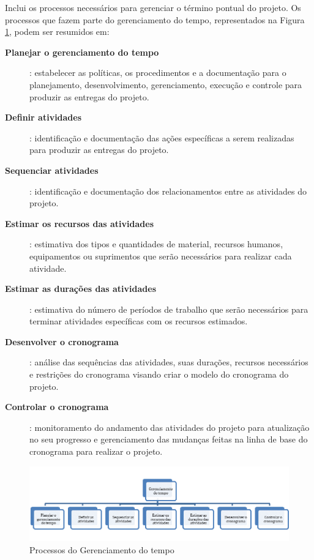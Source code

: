 

Inclui os processos necessários para gerenciar o término pontual do projeto. Os processos que fazem parte do gerenciamento do tempo, representados na Figura \ref{fig:proc:ger:tempo}, podem ser resumidos em:

\begin{description}
	
	\item[\textbf{Planejar o gerenciamento do tempo}]: estabelecer as políticas, os procedimentos e a documentação para o planejamento, desenvolvimento, gerenciamento, execução e controle para produzir as entregas do projeto.
	
	\item[\textbf{Definir atividades}]: identificação e documentação das ações específicas a serem realizadas para produzir as entregas do projeto.
	
	\item[\textbf{Sequenciar atividades}]: identificação e documentação dos relacionamentos entre as atividades do projeto.
	
	\item[\textbf{Estimar os recursos das atividades}]: estimativa dos tipos e quantidades de material, recursos humanos, equipamentos ou suprimentos que serão necessários para realizar cada atividade.
	
	\item[\textbf{Estimar as durações das atividades}]: estimativa do número de períodos de trabalho que serão necessários para terminar atividades específicas com os recursos estimados.
	
	\item[\textbf{Desenvolver o cronograma}]: análise das sequências das atividades, suas durações, recursos necessários e restrições do cronograma visando criar o modelo do cronograma do projeto.	
	
	\item[\textbf{Controlar o cronograma}]: monitoramento do andamento das atividades do projeto para atualização no seu progresso e gerenciamento das mudanças feitas na linha de base do cronograma para realizar o projeto.	
	
\end{description}

\begin{figure}[!h]
	\centering
	\includegraphics[scale=0.75]{Figuras/gerenciamento_tempo.png}
	\caption{Processos do Gerenciamento do tempo}
	\label{fig:proc:ger:tempo}
\end{figure}

